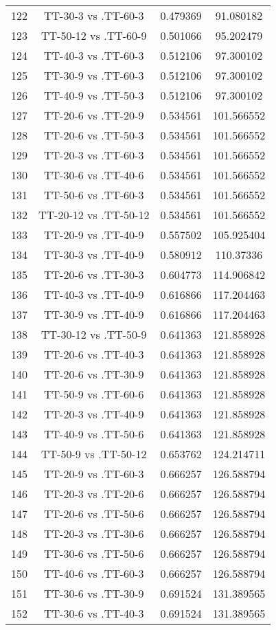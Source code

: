 \documentclass[a4paper,10pt]{article}
\begin{document}
\begin{landscape}
\begin{table}[!htp]
\begin{tabular}{cccc}
122&TT-30-3 vs .TT-60-3&0.479369&91.080182\\
123&TT-50-12 vs .TT-60-9&0.501066&95.202479\\
124&TT-40-3 vs .TT-60-3&0.512106&97.300102\\
125&TT-30-9 vs .TT-60-3&0.512106&97.300102\\
126&TT-40-9 vs .TT-50-3&0.512106&97.300102\\
127&TT-20-6 vs .TT-20-9&0.534561&101.566552\\
128&TT-20-6 vs .TT-50-3&0.534561&101.566552\\
129&TT-20-3 vs .TT-60-3&0.534561&101.566552\\
130&TT-30-6 vs .TT-40-6&0.534561&101.566552\\
131&TT-50-6 vs .TT-60-3&0.534561&101.566552\\
132&TT-20-12 vs .TT-50-12&0.534561&101.566552\\
133&TT-20-9 vs .TT-40-9&0.557502&105.925404\\
134&TT-30-3 vs .TT-40-9&0.580912&110.37336\\
135&TT-20-6 vs .TT-30-3&0.604773&114.906842\\
136&TT-40-3 vs .TT-40-9&0.616866&117.204463\\
137&TT-30-9 vs .TT-40-9&0.616866&117.204463\\
138&TT-30-12 vs .TT-50-9&0.641363&121.858928\\
139&TT-20-6 vs .TT-40-3&0.641363&121.858928\\
140&TT-20-6 vs .TT-30-9&0.641363&121.858928\\
141&TT-50-9 vs .TT-60-6&0.641363&121.858928\\
142&TT-20-3 vs .TT-40-9&0.641363&121.858928\\
143&TT-40-9 vs .TT-50-6&0.641363&121.858928\\
144&TT-50-9 vs .TT-50-12&0.653762&124.214711\\
145&TT-20-9 vs .TT-60-3&0.666257&126.588794\\
146&TT-20-3 vs .TT-20-6&0.666257&126.588794\\
147&TT-20-6 vs .TT-50-6&0.666257&126.588794\\
148&TT-20-3 vs .TT-30-6&0.666257&126.588794\\
149&TT-30-6 vs .TT-50-6&0.666257&126.588794\\
150&TT-40-6 vs .TT-60-3&0.666257&126.588794\\
151&TT-30-6 vs .TT-30-9&0.691524&131.389565\\
152&TT-30-6 vs .TT-40-3&0.691524&131.389565\\

\end{tabular}
\end{table}
\end{landscape}
\end{document}
